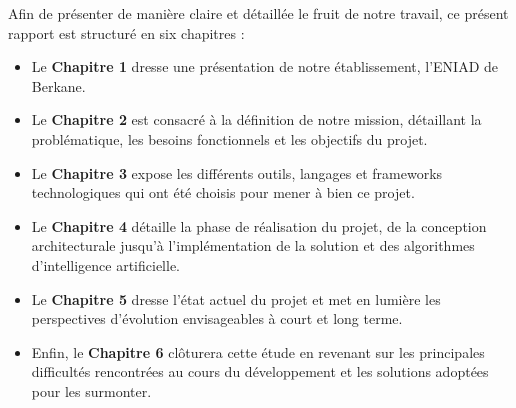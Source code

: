 Afin de présenter de manière claire et détaillée le fruit de notre travail, ce présent rapport est structuré en six chapitres :
\begin{itemize}
    \item Le \textbf{Chapitre 1} dresse une présentation de notre établissement, l'ENIAD de Berkane.
    \item Le \textbf{Chapitre 2} est consacré à la définition de notre mission, détaillant la problématique, les besoins fonctionnels et les objectifs du projet.
    \item Le \textbf{Chapitre 3} expose les différents outils, langages et frameworks technologiques qui ont été choisis pour mener à bien ce projet.
    \item Le \textbf{Chapitre 4} détaille la phase de réalisation du projet, de la conception architecturale jusqu'à l'implémentation de la solution et des algorithmes d'intelligence artificielle.
    \item Le \textbf{Chapitre 5} dresse l'état actuel du projet et met en lumière les perspectives d'évolution envisageables à court et long terme.
    \item Enfin, le \textbf{Chapitre 6} clôturera cette étude en revenant sur les principales difficultés rencontrées au cours du développement et les solutions adoptées pour les surmonter.
\end{itemize}